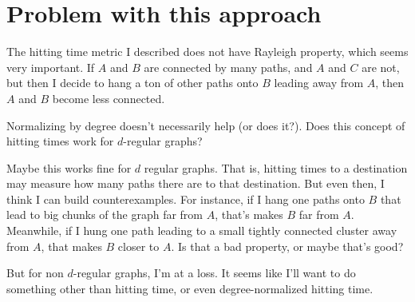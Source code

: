 \section{Problem with this approach} The hitting time metric I described does not have Rayleigh
property, which seems very important. If $A$ and $B$ are
connected by many paths, and $A$ and $C$ are not, but then I
decide to hang a ton of other paths onto $B$ leading away from
$A$, then $A$ and $B$
become less connected.

Normalizing by degree doesn't necessarily help (or does it?).
Does this concept of hitting times work for $d$-regular graphs?

Maybe this works fine for $d$ regular graphs. That is, hitting
times to a destination may measure how many paths there are to
that destination. But even then, I think I can build
counterexamples. For instance, if I hang one paths onto $B$ that
lead to big chunks of the graph far from $A$, that's makes $B$
far from $A$. Meanwhile, if I hung one path leading to a small
tightly connected cluster away from $A$, that makes $B$ closer to
$A$. Is that a bad property, or maybe that's good?

But for non $d$-regular graphs, I'm at a loss. It seems like I'll
want to do something other than hitting time, or even
degree-normalized hitting time. 
